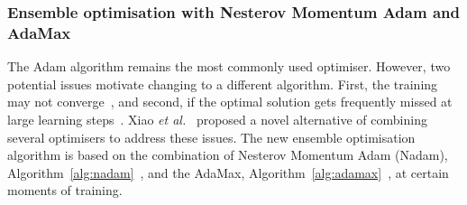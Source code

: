 %
\subsubsection{Ensemble optimisation with Nesterov Momentum Adam and AdaMax}
The Adam algorithm remains the most commonly used optimiser.
However, two potential issues motivate changing to a different algorithm.
First, the training may not converge~\cite{reddi_convergence_2019},
and second, if the optimal solution gets frequently missed at large learning steps~\cite{wilson_marginal_2017}.
Xiao \textit{et al.}~\cite{xiao_accurate_2019} proposed a novel alternative of combining several optimisers to address these issues.
The new ensemble optimisation algorithm is based on the combination of Nesterov Momentum Adam (Nadam), \mbox{Algorithm~\ref{alg:nadam}}~\cite{dozat_nadam_2016}, and the AdaMax, \mbox{Algorithm~\ref{alg:adamax}}~\cite{kingma_adam_2017}, at certain moments of training.


